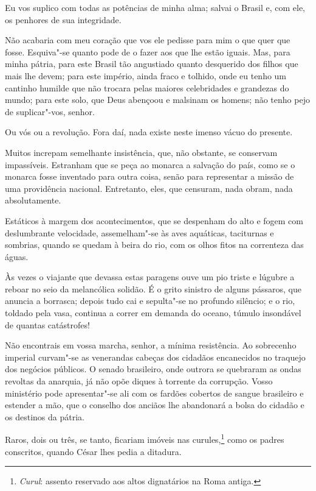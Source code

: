 \begin{linenumbers}
 Eu vos suplico com todas as potências de minha alma; salvai o Brasil e,
com ele, os penhores de sua integridade.

 Não acabaria com meu coração que vos ele pedisse para mim o que quer
que fosse. Esquiva"-se quanto pode de o fazer aos que lhe estão
iguais. Mas, para minha pátria, para este Brasil tão angustiado quanto
desquerido dos filhos que mais lhe devem; para este império, ainda
fraco e tolhido, onde eu tenho um cantinho humilde que não trocara
pelas maiores celebridades e grandezas do mundo; para este solo, que
Deus abençoou e malsinam os homens; não tenho pejo de suplicar"-vos, senhor. 

 Ou vós ou a revolução. Fora daí, nada existe neste imenso vácuo do presente. 

 Muitos increpam semelhante insistência, que, não obstante, se conservam
impassíveis. Estranham que se peça ao monarca a salvação do país, como
se o monarca fosse inventado para outra coisa, senão para representar a
missão de uma providência nacional. Entretanto, eles, que censuram,
nada obram, nada absolutamente.

 Estáticos à margem dos acontecimentos, que se despenham do alto e fogem
com deslumbrante velocidade, assemelham"-se às aves aquáticas,
taciturnas e sombrias, quando se quedam à beira do rio, com os olhos
fitos na correnteza das águas. 

 Às vezes o viajante que devassa estas paragens ouve um pio triste e
lúgubre a reboar no seio da melancólica solidão. É o grito sinistro de
alguns pássaros, que anuncia a borrasca; depois tudo cai e sepulta"-se
no profundo silêncio; e o rio, toldado pela vasa, continua a correr em
demanda do oceano, túmulo insondável de quantas catástrofes!

 Não encontrais em vossa marcha, senhor, a mínima resistência. Ao
sobrecenho imperial curvam"-se as venerandas cabeças dos cidadãos
encanecidos no traquejo dos negócios públicos. O senado brasileiro,
onde outrora se quebraram as ondas revoltas da anarquia, já não opõe
diques à torrente da corrupção. Vosso ministério pode apresentar"-se
ali com os fardões cobertos de sangue brasileiro e estender a mão, que
o conselho dos anciãos lhe abandonará a bolsa do cidadão e os destinos da pátria.

 Raros, dois ou três, se tanto, ficariam imóveis nas
curules,\footnote{ \textit{Curul}: assento reservado aos altos dignatários na Roma antiga.}
 como os padres conscritos, quando César lhes pedia a ditadura. 


\end{linenumbers}
